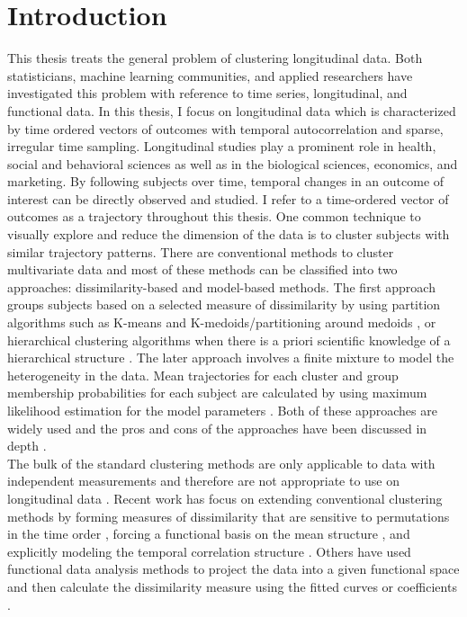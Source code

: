 \chapter{Introduction}

This thesis treats the general problem of clustering longitudinal data. Both statisticians, machine learning communities, and applied researchers have investigated this problem with reference to time series, longitudinal, and functional data. In this thesis, I focus on longitudinal data which is characterized by time ordered vectors of outcomes with temporal autocorrelation and sparse, irregular time sampling. Longitudinal studies play a prominent role in health, social and behavioral sciences as well as in the biological sciences, economics, and marketing. By following subjects over time, temporal changes in an outcome of interest can be directly observed and studied. I refer to a time-ordered vector of outcomes as a trajectory throughout this thesis. One common technique to visually explore and reduce the dimension of the data is to cluster subjects with similar trajectory patterns. There are conventional methods to cluster multivariate data and most of these methods can be classified into two approaches: dissimilarity-based and model-based methods. The first approach groups subjects based on a selected measure of dissimilarity by using partition algorithms such as K-means \cite{macqueen1967, hartigan1979} and K-medoids/partitioning around medoids \cite{kaufman1990}, or hierarchical clustering algorithms when there is a priori scientific knowledge of a hierarchical structure \cite{murtagh1983}. The later approach involves a finite mixture to model the heterogeneity in the data. Mean trajectories for each cluster and group membership probabilities for each subject are calculated by using maximum likelihood estimation for the model parameters \cite{mclachlan1988,mclachlan2000,everitt1981}. Both of these approaches are widely used and the pros and cons of the approaches have been discussed in depth \cite{magidson2002, everitt1981}.\\

The bulk of the standard clustering methods are only applicable to data with independent measurements and therefore are not appropriate to use on longitudinal data \cite{everitt2009}. Recent work has focus on extending conventional clustering methods by forming measures of dissimilarity that are sensitive to permutations in the time order \cite{chouakria2007}, forcing a functional basis on the mean structure \cite{nagin1999,gaffney1999}, and explicitly modeling the temporal correlation structure \cite{muthen1999,fraley1999,mcnicholas2010}. Others have used functional data analysis methods \cite{ramsay2002} to project the data into a given functional space and then calculate the dissimilarity measure using the fitted curves or coefficients \cite{serban2005, tarpey2003, abraham2003, tarpey2007,hitchcock2007}.

